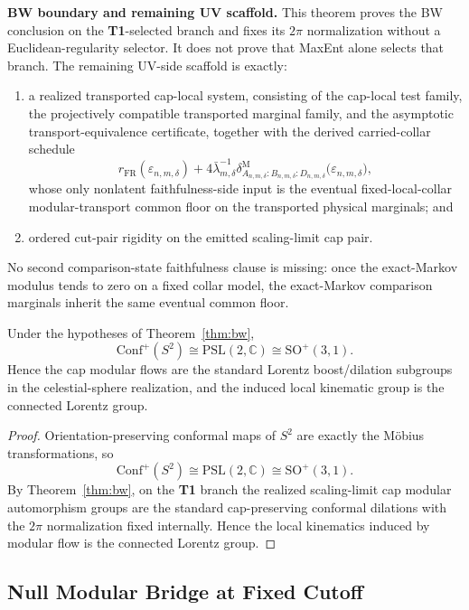 \textbf{BW boundary and remaining UV scaffold.} This theorem proves the BW conclusion on the \textbf{T1}-selected branch and fixes its \(2\pi\) normalization without a Euclidean-regularity selector. It does not prove that MaxEnt alone selects that branch. The remaining UV-side scaffold is exactly:
\begin{enumerate}[leftmargin=2em]
\item a realized transported cap-local system, consisting of the cap-local test family, the projectively compatible transported marginal family, and the asymptotic transport-equivalence certificate, together with the derived carried-collar schedule
\[
r_{\mathrm{FR}}(\varepsilon_{n,m,\delta})
+
4\bar\lambda_{m,\delta}^{-1}
\delta^{\mathrm M}_{A_{n,m,\delta}:B_{n,m,\delta}:D_{n,m,\delta}}
\bigl(\varepsilon_{n,m,\delta}\bigr),
\]
whose only nonlatent faithfulness-side input is the eventual fixed-local-collar modular-transport common floor on the transported physical marginals; and
\item ordered cut-pair rigidity on the emitted scaling-limit cap pair.
\end{enumerate}
No second comparison-state faithfulness clause is missing: once the exact-Markov modulus tends to zero on a fixed collar model, the exact-Markov comparison marginals inherit the same eventual common floor.

\begin{corollary}\label{cor:lorentz}
Under the hypotheses of Theorem~\ref{thm:bw},
\[
\mathrm{Conf}^+(S^2)\cong \mathrm{PSL}(2,\mathbb C)\cong \mathrm{SO}^+(3,1).
\]
Hence the cap modular flows are the standard Lorentz boost/dilation subgroups in the celestial-sphere realization, and the induced local kinematic group is the connected Lorentz group.
\end{corollary}

\begin{proof}
Orientation-preserving conformal maps of \(S^2\) are exactly the M\"obius transformations, so
\[
\mathrm{Conf}^+(S^2)\cong \mathrm{PSL}(2,\mathbb C)\cong \mathrm{SO}^+(3,1).
\]
By Theorem~\ref{thm:bw}, on the \textbf{T1} branch the realized scaling-limit cap modular automorphism groups are the standard cap-preserving conformal dilations with the \(2\pi\) normalization fixed internally. Hence the local kinematics induced by modular flow is the connected Lorentz group.
\end{proof}
\subsection{Null Modular Bridge at Fixed Cutoff}\label{23-null-modular-bridge-eft-conditions-n1-n3}

